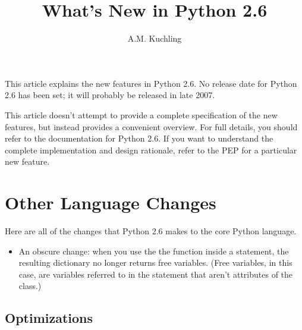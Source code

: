 \documentclass{howto}
\title{What's New in Python 2.6}
\author{A.M. Kuchling}
\begin{document}
\maketitle
\tableofcontents

This article explains the new features in Python 2.6.  No release date
for Python 2.6 has been set; it will probably be released in late 2007.


This article doesn't attempt to provide a complete specification of
the new features, but instead provides a convenient overview.  For
full details, you should refer to the documentation for Python 2.6.
If you want to understand the complete implementation and design
rationale, refer to the PEP for a particular new feature.





\section{Other Language Changes}

Here are all of the changes that Python 2.6 makes to the core Python
language.

\begin{itemize}

\item An obscure change: when you use the the 
function inside a  statement, the resulting dictionary
no longer returns free variables.  (Free variables, in this case, are
variables referred to in the  statement 
that aren't attributes of the class.)

\end{itemize}


\subsection{Optimizations}
\end{document}
